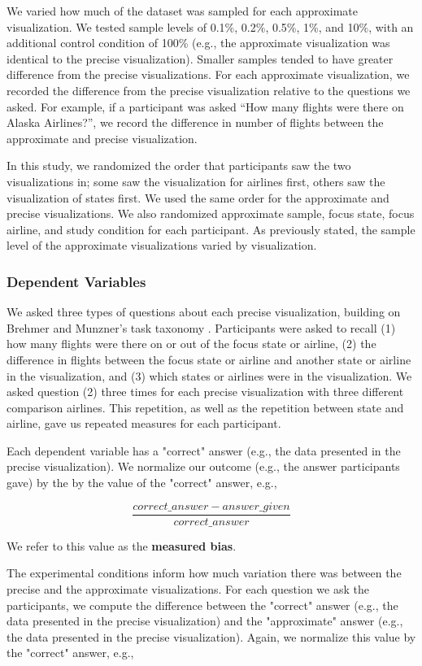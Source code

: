 \documentclass[10pt,journal,compsoc]{IEEEtran}
\begin{document}
We varied how much of the dataset was sampled for each approximate visualization.
We tested sample levels of 0.1\%, 0.2\%, 0.5\%, 1\%, and 10\%, with an additional control condition of 100\% (e.g., the approximate visualization was identical to the precise visualization).
Smaller samples tended to have greater difference from the precise visualizations.
For each approximate visualization, we recorded the difference from the precise visualization relative to the questions we asked.
For example, if a participant was asked ``How many flights were there on Alaska Airlines?'', we record the difference in number of flights between the approximate and precise visualization.

In this study, we randomized the order that participants saw the two visualizations in; some saw the visualization for airlines first, others saw the visualization of states first.
We used the same order for the approximate and precise visualizations.
We also randomized approximate sample, focus state, focus airline, and study condition for each participant.
As previously stated, the sample level of the approximate visualizations varied by visualization.

\subsubsection{Dependent Variables}

We asked three types of questions about each precise visualization, building on Brehmer and Munzner's task taxonomy \cite{brehmer2013multi}.
Participants were asked to recall (1) how many flights were there on or out of the focus state or airline, (2) the difference in flights between the focus state or airline and another state or airline in the visualization, and (3) which states or airlines were in the visualization.
We asked question (2) three times for each precise visualization with three different comparison airlines.
This repetition, as well as the repetition between state and airline, gave us repeated measures for each participant.

Each dependent variable has a "correct" answer (e.g., the data presented in the precise visualization).
We normalize our outcome (e.g., the answer participants gave) by the by the value of the "correct" answer, e.g.,

\[\frac{correct\_answer - answer\_given}{correct\_answer}\]

We refer to this value as the \textbf{measured bias}.

The experimental conditions inform how much variation there was between the precise and the approximate visualizations.
For each question we ask the participants, we compute the difference between the "correct" answer (e.g., the data presented in the precise visualization) and the "approximate" answer (e.g., the data presented in the precise visualization).
Again, we normalize this value by the "correct" answer, e.g.,
\end{document}
